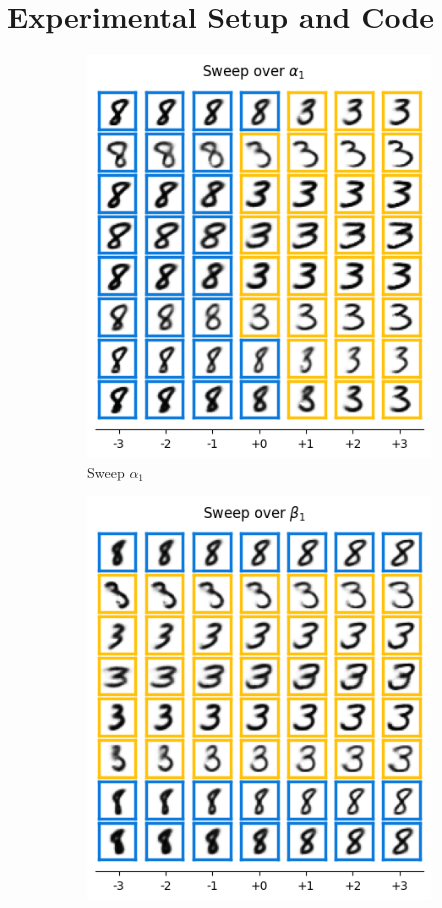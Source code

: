 \section{Experimental Setup and Code}
\label{sec:experiments}
\begin{figure}[t]
\centering
    \begin{subfigure}[t]{.23\linewidth}
        \includegraphics[width=.9\textwidth]{../openreview/pictures/Figure3/alpha_1.png}
        \caption{Sweep $\alpha_1$}
    \end{subfigure}
    \begin{subfigure}[t]{.23\linewidth}
        \includegraphics[width=.9\textwidth]{../openreview/pictures/Figure3/beta_1.png}

\end{subfigure}
\end{figure}
